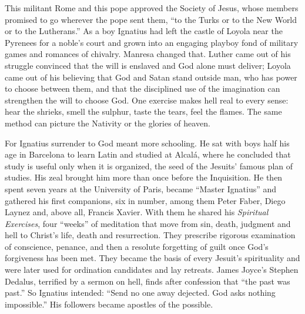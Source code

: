 This militant Rome and this pope approved the Society of Jesus, whose members promised to go wherever
the pope sent them, ``to the Turks or to the New World or to the Lutherans.'' As a boy Ignatius had
left the castle of Loyola near the Pyrenees for a noble's court and grown into an engaging playboy
fond of military games and romances of chivalry. Manresa changed that. Luther came out of his struggle
convinced that the will is enslaved and God alone must deliver; Loyola came out of his believing that
God and Satan stand outside man, who has power to choose between them, and that the disciplined use
of the imagination can strengthen the will to choose God. One exercise makes hell real to every
sense: hear the shrieks, smell the sulphur, taste the tears, feel the flames. The same method can
picture the Nativity or the glories of heaven.

For Ignatius surrender to God meant more schooling. He sat with boys half his age in Barcelona to
learn Latin and studied at Alcal\'a, where he concluded that study is useful only when it is organized, the seed of the Jesuits' famous plan of studies. His zeal brought him more than once before the
Inquisition. He then spent seven years at the University of Paris, became ``Master Ignatius'' and
gathered his first companions, six in number, among them Peter Faber, Diego Laynez and, above all, Francis Xavier. With them he shared his \emph{Spiritual Exercises}, four
``weeks'' of meditation that move from sin, death, judgment and hell to Christ's life, death and
resurrection. They prescribe rigorous examination of conscience, penance, and then a resolute
forgetting of guilt once God's forgiveness has been met. They became the basis of every Jesuit's
spirituality and were later used for ordination candidates and lay retreats. James Joyce's Stephen
Dedalus, terrified by a sermon on hell, finds after confession that ``the past was past.'' So
Ignatius intended: ``Send no one away dejected. God asks nothing impossible.'' His followers became
apostles of the possible.

